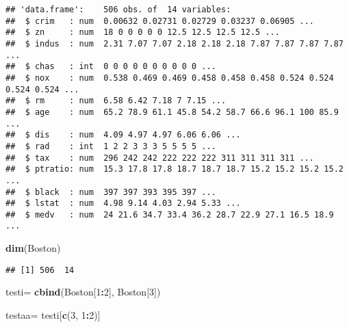 \documentclass[
]{article}
\author{}
\date{\vspace{-2.5em}}
\newenvironment{Shaded}{\begin{snugshade}}{\end{snugshade}}
\newcommand{\CommentTok}[1]{\textcolor[rgb]{0.56,0.35,0.01}{\textit{#1}}}
\newcommand{\DecValTok}[1]{\textcolor[rgb]{0.00,0.00,0.81}{#1}}
\newcommand{\KeywordTok}[1]{\textcolor[rgb]{0.13,0.29,0.53}{\textbf{#1}}}
\newcommand{\NormalTok}[1]{#1}
\newcommand{\OperatorTok}[1]{\textcolor[rgb]{0.81,0.36,0.00}{\textbf{#1}}}
\newcommand{\StringTok}[1]{\textcolor[rgb]{0.31,0.60,0.02}{#1}}
\begin{document}
\begin{Shaded}
\end{Shaded}

\begin{verbatim}
## 'data.frame':    506 obs. of  14 variables:
##  $ crim   : num  0.00632 0.02731 0.02729 0.03237 0.06905 ...
##  $ zn     : num  18 0 0 0 0 0 12.5 12.5 12.5 12.5 ...
##  $ indus  : num  2.31 7.07 7.07 2.18 2.18 2.18 7.87 7.87 7.87 7.87 ...
##  $ chas   : int  0 0 0 0 0 0 0 0 0 0 ...
##  $ nox    : num  0.538 0.469 0.469 0.458 0.458 0.458 0.524 0.524 0.524 0.524 ...
##  $ rm     : num  6.58 6.42 7.18 7 7.15 ...
##  $ age    : num  65.2 78.9 61.1 45.8 54.2 58.7 66.6 96.1 100 85.9 ...
##  $ dis    : num  4.09 4.97 4.97 6.06 6.06 ...
##  $ rad    : int  1 2 2 3 3 3 5 5 5 5 ...
##  $ tax    : num  296 242 242 222 222 222 311 311 311 311 ...
##  $ ptratio: num  15.3 17.8 17.8 18.7 18.7 18.7 15.2 15.2 15.2 15.2 ...
##  $ black  : num  397 397 393 395 397 ...
##  $ lstat  : num  4.98 9.14 4.03 2.94 5.33 ...
##  $ medv   : num  24 21.6 34.7 33.4 36.2 28.7 22.9 27.1 16.5 18.9 ...
\end{verbatim}

\begin{Shaded}
\begin{Highlighting}[]
\KeywordTok{dim}\NormalTok{(Boston)}
\end{Highlighting}
\end{Shaded}

\begin{verbatim}
## [1] 506  14
\end{verbatim}

\begin{Shaded}
\begin{Highlighting}[]
\NormalTok{testi=}\StringTok{ }\KeywordTok{cbind}\NormalTok{(Boston[}\DecValTok{1}\OperatorTok{:}\DecValTok{2}\NormalTok{], Boston[}\DecValTok{3}\NormalTok{])}

\NormalTok{testaa=}\StringTok{ }\NormalTok{testi[}\KeywordTok{c}\NormalTok{(}\DecValTok{3}\NormalTok{, }\DecValTok{1}\OperatorTok{:}\DecValTok{2}\NormalTok{)]}
\end{Highlighting}
\end{Shaded}
\end{document}
